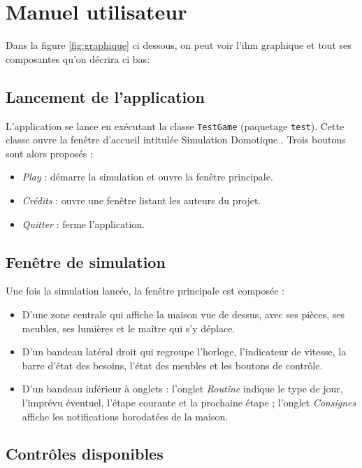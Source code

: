 \newpage
\section{Manuel utilisateur}
\label{sec:manuel}

Dans la figure \ref{fig:graphique} ci dessous, on peut voir l'ihm graphique et tout ses composantes qu'on décrira ci bas: 

\subsection{Lancement de l'application}

L'application se lance en exécutant la classe \texttt{TestGame} (paquetage \texttt{test}). Cette classe ouvre la fenêtre d'accueil intitulée \og Simulation Domotique \fg. Trois boutons sont alors proposés :
\begin{itemize}
\item \textit{Play} : démarre la simulation et ouvre la fenêtre principale.
\item \textit{Crédits} : ouvre une fenêtre listant les auteurs du projet.
\item \textit{Quitter} : ferme l'application.
\end{itemize}

\subsection{Fenêtre de simulation}

Une fois la simulation lancée, la fenêtre principale est composée :
\begin{itemize}
\item D'une zone centrale qui affiche la maison vue de dessus, avec ses pièces, ses meubles, ses lumières et le maître qui s'y déplace.
\item D'un bandeau latéral droit qui regroupe l'horloge, l'indicateur de vitesse, la barre d'état des besoins, l'état des meubles et les boutons de contrôle.
\item D'un bandeau inférieur à onglets : l'onglet \textit{Routine} indique le type de jour, l'imprévu éventuel, l'étape courante et la prochaine étape ; l'onglet \textit{Consignes} affiche les notifications horodatées de la maison.
\end{itemize}

\subsection{Contrôles disponibles}

